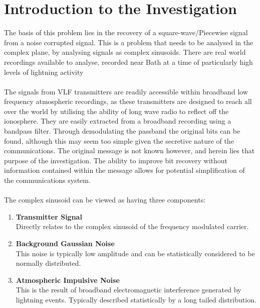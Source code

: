\section{Introduction to the Investigation}
The basis of this problem lies in the recovery of a square-wave/Piecewise signal from a noise corrupted signal. This is a problem that needs to be analysed in the complex plane, by analysing signals as complex sinusoids. There are real world recordings available to analyse, recorded near Bath at a time of particularly high levels of lightning activity
\\\\
The signals from VLF transmitters are readily accessible within broadband low frequency atmospheric recordings, as these transmitters are designed to reach all over the world by utilising the ability of long wave radio to reflect off the ionosphere. They are easily extracted from a broadband recording using a bandpass filter. Through demodulating the passband the original bits can be found, although this may seem too simple given the secretive nature of the communications. The original message is not known however, and herein lies that purpose of the investigation. The ability to improve bit recovery without information contained within the message allows for potential simplification of the communications system.
\\\\
The complex sinusoid can be viewed as having three components:
\begin{enumerate}
    \item \textbf{Transmitter Signal }
    \\
    Directly relates to the complex sinusoid of the frequency modulated carrier.
    \item \textbf{Background Gaussian Noise}
    \\
    This noise is typically low amplitude and can be statistically considered to be normally distributed.
    \item \textbf{Atmospheric Impulsive Noise}
    \\
    This is the result of broadband electromagnetic interference generated by lightning events. Typically described statistically by a long tailed distribution.
\end{enumerate}

